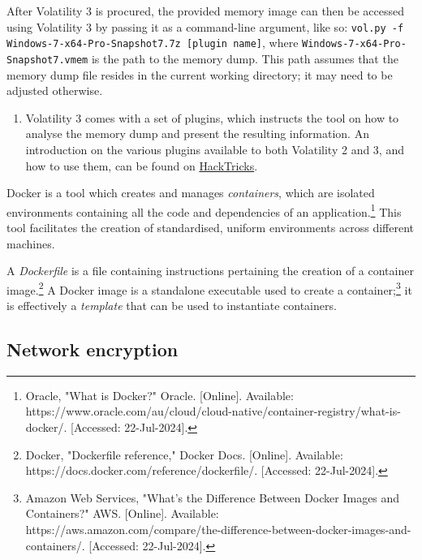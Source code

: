 \begin{myenum}
	\item After Volatility 3 is procured, the provided memory image can then be accessed using Volatility 3 by passing it as a command-line argument, like so: \texttt{vol.py -f Windows-7-x64-Pro-Snapshot7.7z [plugin name]}, where \texttt{Windows-7-x64-Pro-Snapshot7.vmem} is the path to the memory dump. This path assumes that the memory dump file resides in the current working directory; it may need to be adjusted otherwise.
	\begin{enumerate}
		\item Volatility 3 comes with a set of plugins, which instructs the tool on how to analyse the memory dump and present the resulting information. An introduction on the various plugins available to both Volatility 2 and 3, and how to use them, can be found on \href{https://book.hacktricks.xyz/generic-methodologies-and-resources/basic-forensic-methodology/memory-dump-analysis/volatility-cheatsheet}{HackTricks}.
	\end{enumerate}
	\item Docker is a tool which creates and manages \emph{containers}, which are isolated environments containing all the code and dependencies of an application.\footnote{Oracle, "What is Docker?" Oracle. [Online]. Available: https://www.oracle.com/au/cloud/cloud-native/container-registry/what-is-docker/. [Accessed: 22-Jul-2024].} This tool facilitates the creation of standardised, uniform environments across different machines.
	\item A \emph{Dockerfile} is a file containing instructions pertaining the creation of a container image.\footnote{Docker, "Dockerfile reference," Docker Docs. [Online]. Available: https://docs.docker.com/reference/dockerfile/. [Accessed: 22-Jul-2024].} A Docker image is a standalone executable used to create a container;\footnote{Amazon Web Services, "What’s the Difference Between Docker Images and Containers?" AWS. [Online]. Available: https://aws.amazon.com/compare/the-difference-between-docker-images-and-containers/. [Accessed: 22-Jul-2024].} it is effectively a \emph{template} that can be used to instantiate containers.
\end{myenum}

\subsection{Network encryption} %
\label{sub:Network encryption}

